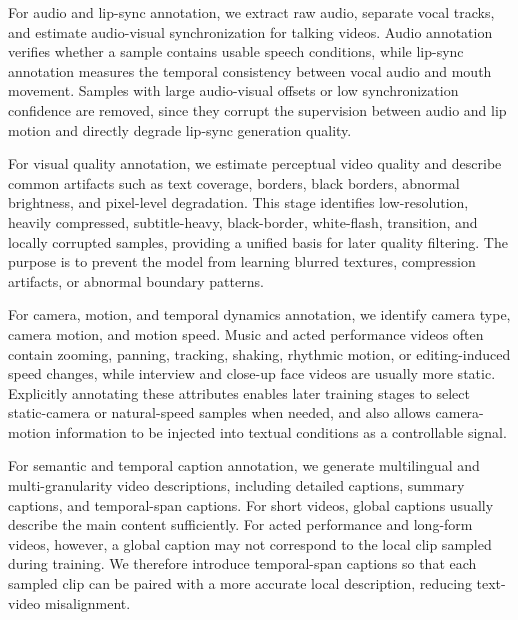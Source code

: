 For audio and lip-sync annotation, we extract raw audio, separate vocal tracks, and estimate audio-visual synchronization for talking videos. Audio annotation verifies whether a sample contains usable speech conditions, while lip-sync annotation measures the temporal consistency between vocal audio and mouth movement. Samples with large audio-visual offsets or low synchronization confidence are removed, since they corrupt the supervision between audio and lip motion and directly degrade lip-sync generation quality.

For visual quality annotation, we estimate perceptual video quality and describe common artifacts such as text coverage, borders, black borders, abnormal brightness, and pixel-level degradation. This stage identifies low-resolution, heavily compressed, subtitle-heavy, black-border, white-flash, transition, and locally corrupted samples, providing a unified basis for later quality filtering. The purpose is to prevent the model from learning blurred textures, compression artifacts, or abnormal boundary patterns.

For camera, motion, and temporal dynamics annotation, we identify camera type, camera motion, and motion speed. Music and acted performance videos often contain zooming, panning, tracking, shaking, rhythmic motion, or editing-induced speed changes, while interview and close-up face videos are usually more static. Explicitly annotating these attributes enables later training stages to select static-camera or natural-speed samples when needed, and also allows camera-motion information to be injected into textual conditions as a controllable signal.

For semantic and temporal caption annotation, we generate multilingual and multi-granularity video descriptions, including detailed captions, summary captions, and temporal-span captions. For short videos, global captions usually describe the main content sufficiently. For acted performance and long-form videos, however, a global caption may not correspond to the local clip sampled during training. We therefore introduce temporal-span captions so that each sampled clip can be paired with a more accurate local description, reducing text-video misalignment.



